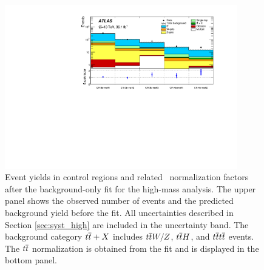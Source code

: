 \begin{figure}[htbp]
	\centering
	\includegraphics[width=0.9\textwidth]{figures/ewk_prod/etmiss_results/histpull_pulls_in_CR_qcdStrong}
	\caption{Event yields in control regions and related \ttbar\
          normalization factors after the background-only fit for
          the high-mass analysis. The upper panel shows 
		the observed number of events and the predicted background yield before the fit.
		All uncertainties described in Section \ref{sec:syst_high} are included in the uncertainty band. The background category $t\overline{t}+X$ includes $t\overline{t} W/Z$, $t\overline{t} H$, and $t\overline{t} t\overline{t}$ events.  
		The $t\overline{t}$ normalization is obtained from the fit
                and is displayed in the bottom panel.
	} 
	\label{fig:pullCR}
\end{figure}


